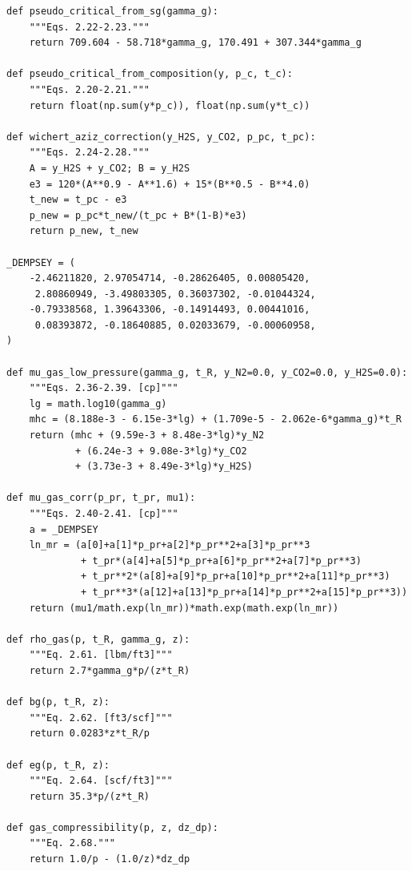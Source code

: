 \documentclass[10pt,a4paper,openany]{book}
\begin{document}
\begin{lstlisting}
def pseudo_critical_from_sg(gamma_g):
    """Eqs. 2.22-2.23."""
    return 709.604 - 58.718*gamma_g, 170.491 + 307.344*gamma_g

def pseudo_critical_from_composition(y, p_c, t_c):
    """Eqs. 2.20-2.21."""
    return float(np.sum(y*p_c)), float(np.sum(y*t_c))

def wichert_aziz_correction(y_H2S, y_CO2, p_pc, t_pc):
    """Eqs. 2.24-2.28."""
    A = y_H2S + y_CO2; B = y_H2S
    e3 = 120*(A**0.9 - A**1.6) + 15*(B**0.5 - B**4.0)
    t_new = t_pc - e3
    p_new = p_pc*t_new/(t_pc + B*(1-B)*e3)
    return p_new, t_new

_DEMPSEY = (
    -2.46211820, 2.97054714, -0.28626405, 0.00805420,
     2.80860949, -3.49803305, 0.36037302, -0.01044324,
    -0.79338568, 1.39643306, -0.14914493, 0.00441016,
     0.08393872, -0.18640885, 0.02033679, -0.00060958,
)

def mu_gas_low_pressure(gamma_g, t_R, y_N2=0.0, y_CO2=0.0, y_H2S=0.0):
    """Eqs. 2.36-2.39. [cp]"""
    lg = math.log10(gamma_g)
    mhc = (8.188e-3 - 6.15e-3*lg) + (1.709e-5 - 2.062e-6*gamma_g)*t_R
    return (mhc + (9.59e-3 + 8.48e-3*lg)*y_N2
            + (6.24e-3 + 9.08e-3*lg)*y_CO2
            + (3.73e-3 + 8.49e-3*lg)*y_H2S)

def mu_gas_corr(p_pr, t_pr, mu1):
    """Eqs. 2.40-2.41. [cp]"""
    a = _DEMPSEY
    ln_mr = (a[0]+a[1]*p_pr+a[2]*p_pr**2+a[3]*p_pr**3
             + t_pr*(a[4]+a[5]*p_pr+a[6]*p_pr**2+a[7]*p_pr**3)
             + t_pr**2*(a[8]+a[9]*p_pr+a[10]*p_pr**2+a[11]*p_pr**3)
             + t_pr**3*(a[12]+a[13]*p_pr+a[14]*p_pr**2+a[15]*p_pr**3))
    return (mu1/math.exp(ln_mr))*math.exp(math.exp(ln_mr))

def rho_gas(p, t_R, gamma_g, z):
    """Eq. 2.61. [lbm/ft3]"""
    return 2.7*gamma_g*p/(z*t_R)

def bg(p, t_R, z):
    """Eq. 2.62. [ft3/scf]"""
    return 0.0283*z*t_R/p

def eg(p, t_R, z):
    """Eq. 2.64. [scf/ft3]"""
    return 35.3*p/(z*t_R)

def gas_compressibility(p, z, dz_dp):
    """Eq. 2.68."""
    return 1.0/p - (1.0/z)*dz_dp
\end{lstlisting}
\end{document}
